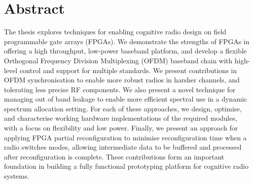 \chapter* {Abstract}

The thesis explores techniques for enabling cognitive radio design on field programmable gate arrays (FPGAs). We demonstrate the strengths of FPGAs in offering a high throughput, low-power baseband platform, and develop a flexible Orthogonal Frequency Division Multiplexing (OFDM) baseband chain with high-level control and support for multiple standards. We present contributions in OFDM synchronisation to enable more robust radios in harsher channels, and tolerating less precise RF components. We also present a novel technique for managing out of band leakage to enable more efficient spectral use in a dynamic spectrum allocation setting. For each of these approaches, we design, optimise, and characterise working hardware implementations of the required modules, with a focus on flexibility and low power. Finally, we present an approach for applying FPGA partial reconfiguration to minimise reconfiguration time when a radio switches modes, allowing intermediate data to be buffered and processed after reconfiguration is complete. These contributions form an important foundation in building a fully functional prototyping platform for cognitive radio systems.